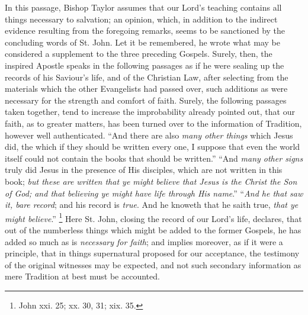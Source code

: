 In this passage, Bishop Taylor assumes that our Lord's teaching
contains all things necessary to salvation; an opinion, which, in
addition to the indirect evidence resulting from the foregoing
remarks, seems to be sanctioned by the concluding words of St. John.
Let it be remembered, he wrote what may be considered a supplement to
the three preceding Gospels. Surely, then, the inspired Apostle speaks
in the following passages as if he were sealing up the records of his
Saviour's life, and of the Christian Law, after selecting from the
materials which the other Evangelists had passed over, such additions
as were necessary for the strength and comfort of faith. Surely, the
following passages taken together, tend to increase the improbability
already pointed out, that our faith, as to greater matters, has been
turned over to the information of Tradition, however well
authenticated. ``And there are also \emph{many other things} which
Jesus did, the which if they should be written every one, I suppose
that even the world itself could not contain the books that should be
written.'' ``And \emph{many other signs} truly did Jesus in
the presence of His disciples, which are not written in this book; \emph{but
these are written that ye might believe that Jesus is the Christ the
Son of God; and that believing ye might have life through His name}.''
``\emph{And he that saw it, bare record}; and his record is \emph{true}.
And he knoweth that he saith true, \emph{that ye might believe}.''
\footnote{John xxi. 25; xx. 30, 31; xix. 35.} Here St. John, closing
the record of our Lord's life, declares, that out of the numberless
things which might be added to the former Gospels, he has added so
much as is \emph{necessary for faith}; and implies moreover, as if it
were a principle, that in things supernatural proposed for our
acceptance, the testimony of the original witnesses may be expected,
and not such secondary information as mere Tradition at best must be
accounted.

